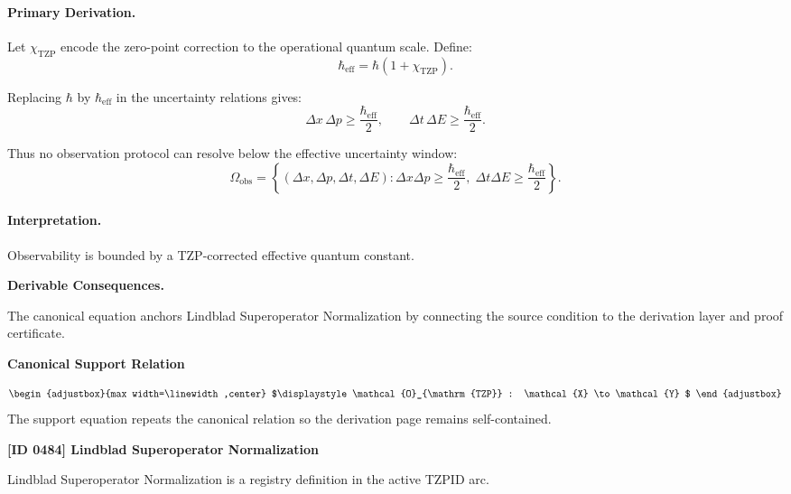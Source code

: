 \paragraph{Primary Derivation.}
Let $\chi_{\mathrm{TZP}}$ encode the zero-point correction to the operational quantum scale.  
Define:
\begin{equation}
\hbar_{\mathrm{eff}}
=
\hbar(1+\chi_{\mathrm{TZP}}).
\end{equation}

Replacing $\hbar$ by $\hbar_{\mathrm{eff}}$ in the uncertainty relations gives:
\begin{equation}
\Delta x\,\Delta p
\geq
\frac{\hbar_{\mathrm{eff}}}{2},
\qquad
\Delta t\,\Delta E
\geq
\frac{\hbar_{\mathrm{eff}}}{2}.
\end{equation}

Thus no observation protocol can resolve below the effective uncertainty window:
\begin{equation}
\boxed{
\Omega_{\mathrm{obs}}
=
\left\{
(\Delta x,\Delta p,\Delta t,\Delta E):
\Delta x\Delta p\geq \frac{\hbar_{\mathrm{eff}}}{2},
\;
\Delta t\Delta E\geq \frac{\hbar_{\mathrm{eff}}}{2}
\right\}.
}
\end{equation}

\paragraph{Interpretation.}
Observability is bounded by a TZP-corrected effective quantum constant.

\par\vspace{0.35em}
\noindent\textbf{Derivable Consequences.}\quad
\begingroup
\footnotesize
\raggedright
The canonical equation anchors Lindblad Superoperator Normalization by connecting the source condition to the derivation layer and proof certificate.
\par\endgroup

\noindent\textbf{Canonical Support Relation}\par
\[
\begin{adjustbox}{max width=\linewidth,center}
$\displaystyle
\mathcal{O}_{\mathrm{TZP}} : \mathcal{X} \to \mathcal{Y}
$
\end{adjustbox}
\]
\noindent The support equation repeats the canonical relation so the derivation page remains self-contained.\par

\clearpage
\noindent\textbf{[ID 0484] Lindblad Superoperator Normalization}\par
\vspace{0.35em}
\begingroup\small
{}
Lindblad Superoperator Normalization is a registry definition in the active TZPID arc.

